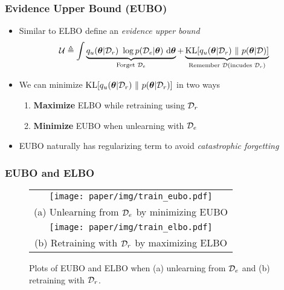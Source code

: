 \documentclass[pdf]{beamer}
\begin{document}
\begin{frame}
  \frametitle{Evidence Upper Bound (EUBO)}
  \begin{itemize}
    \item Similar to ELBO define an \emph{evidence upper bound}
    \[
      \mcl{U} \triangleq \int \underbrace{q_u(\bm{\theta}|\dc)\ \log p(\dr|\bm{\theta})\ \text{d}\bm{\theta}}_{\text{Forget }\dr} + \underbrace{\text{KL}[q_u(\bm{\theta}|\dc)\ \Vert\ p(\bm{\theta}|\da)]}_{\text{Remember } \da (\text{incudes }\dc)} 
    \]
    \item We can minimize $\text{KL}[q_u(\bm{\theta}|\dc)\ \Vert\ p(\bm{\theta}|\dc)]$ in two ways
    \begin{enumerate}
      \item \textbf{Maximize} ELBO while retraining using $\mathcal{D}_r$ 
      \item \textbf{Minimize} EUBO when unlearning with $\mathcal{D}_e$
    \end{enumerate}
    \item EUBO naturally has regularizing term to avoid \emph{catastrophic forgetting}
  \end{itemize}
  

\end{frame}

\begin{frame}
  \frametitle{EUBO and ELBO}
  \begin{figure}
    \begin{tabular}{c}
         \texttt{[image: paper/img/train\_eubo.pdf]}\\
         (a) Unlearning from $\mathcal{D}_e$ by minimizing EUBO\\
         \texttt{[image: paper/img/train\_elbo.pdf]}\\
         (b) Retraining with $\mathcal{D}_r$ by maximizing ELBO
    \end{tabular}
    \caption{Plots of EUBO and ELBO when (a) unlearning from $\mathcal{D}_e$ and (b) retraining with $\mathcal{D}_r$.}
    \label{fig:eubovselbo}
    \end{figure}
\end{frame}

\end{document}
